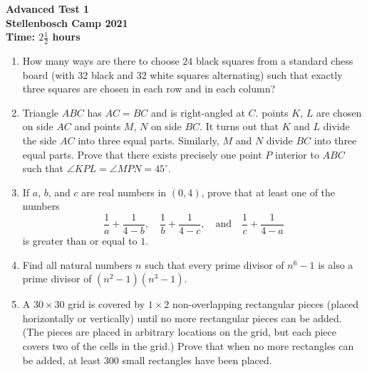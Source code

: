 \documentclass{article}
\begin{document}
\thispagestyle{empty}

\begin{center}
  \textbf{\Large Advanced Test 1}
  \\ \vspace{1em}
  \textbf{\large Stellenbosch Camp 2021}
  \\ \vspace{1em}
  \textbf{\large Time: $2\frac{1}{2}$ hours}
\end{center}

\vspace{24pt}

\begin{enumerate}[1.]

\item %
How many ways are there to choose $24$ black squares from a standard chess board (with $32$ black and $32$ white squares alternating) such that exactly three squares are chosen in each row and in each column?


\item %
Triangle $ABC$ has $AC=BC$ and is right-angled at $C$. points $K$, $L$ are chosen on side $AC$ and points $M$, $N$ on side $BC$. It turns out that $K$ and $L$ divide the side $AC$ into three equal parts. Similarly, $M$ and $N$ divide $BC$ into three equal parts. Prove that there exists precisely one point $P$ interior to $ABC$ such that $\angle KPL = \angle MPN = 45^{\circ}$.


\item %
If $a$, $b$, and $c$ are real numbers in $(0,4)$, prove that at least one of the numbers
\[ \frac{1}{a} +\frac{1}{4-b}, \quad \frac{1}{b} +\frac{1}{4-c}, \quad\text{and}\quad \frac{1}{c} +\frac{1}{4-a} \]
is greater than or equal to $1$.


\item %
Find all natural numbers $n$ such that every prime divisor of $n^6 - 1$ is also a prime divisor of $(n^2 - 1)(n^3 - 1)$. 


\item %
A $30 \times 30$ grid is covered by $1 \times 2$ non-overlapping rectangular pieces (placed horizontally or vertically) until no more rectangular pieces can be added. (The pieces are placed in arbitrary locations on the grid, but each piece covers two of the cells in the grid.) Prove that when no more rectangles can be added, at least $300$ small rectangles have been placed.

\end{enumerate}
\end{document}
